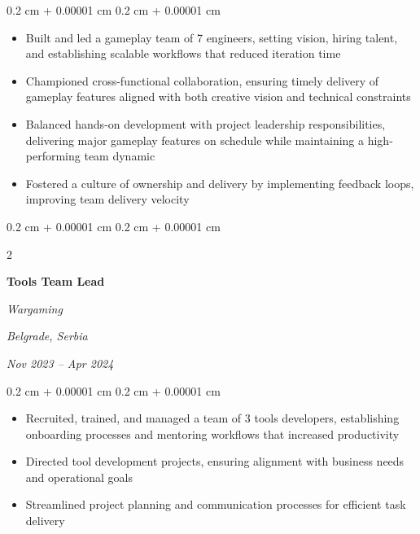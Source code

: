 \documentclass[10pt, letterpaper]{article}
\newenvironment{highlights}{
    \begin{itemize}[
        topsep=0.10 cm,
        parsep=0.10 cm,
        partopsep=0pt,
        itemsep=0pt,
        leftmargin=0.4 cm + 10pt
    ]
}{
    \end{itemize}
} %
\newenvironment{onecolentry}{
    \begin{adjustwidth}{
        0.2 cm + 0.00001 cm
    }{
        0.2 cm + 0.00001 cm
    }
}{
    \end{adjustwidth}
} %
\newenvironment{twocolentry}[2][]{
    \onecolentry
    \def\secondColumn{#2}
    \setcolumnwidth{\fill, 4.5 cm}
    \begin{paracol}{2}
}{
    \switchcolumn \raggedleft \secondColumn
    \end{paracol}
    \endonecolentry
} %
\begin{document}
        \vspace{0.10 cm}
        \begin{onecolentry}
            \begin{highlights}
                \item Built and led a gameplay team of 7 engineers, setting vision, hiring talent, and establishing scalable workflows that reduced iteration time
                \item Championed cross-functional collaboration, ensuring timely delivery of gameplay features aligned with both creative vision and technical constraints
                \item Balanced hands-on development with project leadership responsibilities, delivering major gameplay features on schedule while maintaining a high-performing team dynamic
                \item Fostered a culture of ownership and delivery by implementing feedback loops, improving team delivery velocity
            \end{highlights}
        \end{onecolentry}


        \vspace{0.2 cm}

\begin{twocolentry}{
        \textit{Belgrade, Serbia}    
            
        \textit{Nov 2023 – Apr 2024}}
            \textbf{Tools Team Lead}
            
            \textit{Wargaming}
        \end{twocolentry}

        \vspace{0.10 cm}
        \begin{onecolentry}
            \begin{highlights}
                \item Recruited, trained, and managed a team of 3 tools developers, establishing onboarding processes and mentoring workflows that increased productivity
                \item Directed tool development projects, ensuring alignment with business needs and operational goals
                \item Streamlined project planning and communication processes for efficient task delivery
            \end{highlights}
        \end{onecolentry}
\end{document}
